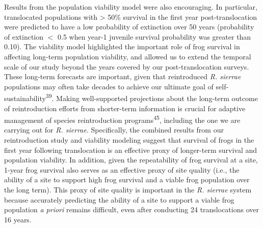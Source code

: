 \documentclass[
  letterpaper,
  DIV=11,
  numbers=noendperiod]{scrartcl}
\begin{document}
Results from the population viability model were also encouraging. In
particular, translocated populations with \textgreater{} 50\% survival
in the first year post-translocation were predicted to have a low
probability of extinction over 50 years (probability of extinction \(<\)
0.5 when year-1 juvenile survival probability was greater than 0.10).
The viability model highlighted the important role of frog survival in
affecting long-term population viability, and allowed us to extend the
temporal scale of our study beyond the years covered by our
post-translocation surveys. These long-term forecasts are important,
given that reintroduced \emph{R. sierrae} populations may often take
decades to achieve our ultimate goal of
self-sustainability\textsuperscript{39}. Making well-supported
projections about the long-term outcome of reintroduction efforts from
shorter-term information is crucial for adaptive management of species
reintroduction programs\textsuperscript{45}, including the one we are
carrying out for \emph{R. sierrae}. Specifically, the combined results
from our reintroduction study and viability modeling suggest that
survival of frogs in the first year following translocation is an
effective proxy of longer-term survival and population viability. In
addition, given the repeatability of frog survival at a site, 1-year
frog survival also serves as an effective proxy of site quality (i.e.,
the ability of a site to support high frog survival and a viable frog
population over the long term). This proxy of site quality is important
in the \emph{R. sierrae} system because accurately predicting the
ability of a site to support a viable frog population \emph{a priori}
remains difficult, even after conducting 24 translocations over 16
years.
\end{document}
